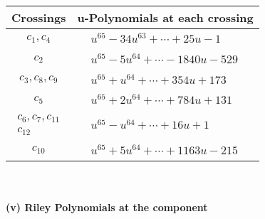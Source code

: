 \documentclass[1p]{elsarticle_modified}
\theoremstyle{definition}
\begin{document}
\begin{tabular}{m{50pt}|m{274pt}}
Crossings & \hspace{64pt}u-Polynomials at each crossing \\
\hline $$\begin{aligned}c_{1},c_{4}\end{aligned}$$&$\begin{aligned}
&u^{65}-34 u^{63}+\cdots+25 u-1
\end{aligned}$\\
\hline $$\begin{aligned}c_{2}\end{aligned}$$&$\begin{aligned}
&u^{65}-5 u^{64}+\cdots-1840 u-529
\end{aligned}$\\
\hline $$\begin{aligned}c_{3},c_{8},c_{9}\end{aligned}$$&$\begin{aligned}
&u^{65}+u^{64}+\cdots+354 u+173
\end{aligned}$\\
\hline $$\begin{aligned}c_{5}\end{aligned}$$&$\begin{aligned}
&u^{65}+2 u^{64}+\cdots+784 u+131
\end{aligned}$\\
\hline $$\begin{aligned}c_{6},c_{7},c_{11}\\c_{12}\end{aligned}$$&$\begin{aligned}
&u^{65}- u^{64}+\cdots+16 u+1
\end{aligned}$\\
\hline $$\begin{aligned}c_{10}\end{aligned}$$&$\begin{aligned}
&u^{65}+5 u^{64}+\cdots+1163 u-215
\end{aligned}$\\
\hline
\end{tabular}\\~\\
\newpage\renewcommand{\arraystretch}{1}
\flushleft \textbf{(v) Riley Polynomials at the component}\newline \\
\end{document}
